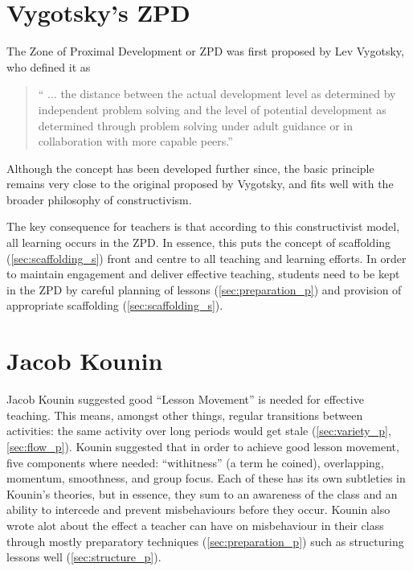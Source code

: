 \documentclass[12pt]{report}
\begin{document}
\section{Vygotsky's ZPD}
\label{sec:zpd_theory}

The Zone of Proximal Development or ZPD was first proposed by Lev Vygotsky, who defined it as

\begin{quote}
`` ... the distance between the actual development level as determined by independent problem solving and the level of potential development as determined through problem solving under adult guidance or in collaboration with more capable peers.''

\hfill \cite{Vygotsky1978}
\end{quote}

Although the concept has been developed further since, the basic principle remains very close to the original proposed by Vygotsky, and fits well with the broader philosophy of constructivism. 

The key consequence for teachers is that according to this constructivist model, all learning occurs in the ZPD. In essence, this puts the concept of scaffolding (\ref{sec:scaffolding_s}) front and centre to all teaching and learning efforts. In order to maintain engagement and deliver effective teaching, students need to be kept in the ZPD by careful planning of lessons (\ref{sec:preparation_p}) and provision of appropriate scaffolding (\ref{sec:scaffolding_s}).



\section{Jacob Kounin}
\label{sec:kounin_theory}

Jacob Kounin suggested good ``Lesson Movement'' is needed for effective teaching. This means, amongst other things, regular transitions between activities: the same activity over long periods would get stale (\ref{sec:variety_p}, \ref{sec:flow_p}). Kounin suggested that in order to achieve good lesson movement, five components where needed: ``withitness'' (a term he coined), overlapping, momentum, smoothness, and group focus. Each of these has its own subtleties in Kounin's theories, but in essence, they sum to an awareness of the class and an ability to intercede and prevent misbehaviours before they occur. Kounin also wrote alot about the effect a teacher can have on misbehaviour in their class through mostly preparatory techniques (\ref{sec:preparation_p}) such as structuring lessons well (\ref{sec:structure_p}).
\end{document}
